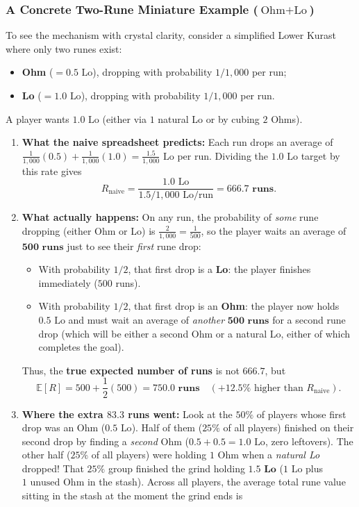 \documentclass[11pt,reqno]{amsart}
\theoremstyle{definition}
\begin{document}
\subsubsection*{A Concrete Two-Rune Miniature Example ($\text{Ohm} + \text{Lo}$)}
To see the mechanism with crystal clarity, consider a simplified Lower Kurast where only two runes exist:
\begin{itemize}
    \item \textbf{Ohm} ($= 0.5\text{ Lo}$), dropping with probability $1/1{,}000$ per run;
    \item \textbf{Lo} ($= 1.0\text{ Lo}$), dropping with probability $1/1{,}000$ per run.
\end{itemize}
A player wants $1.0\text{ Lo}$ (either via $1$ natural Lo or by cubing $2$ Ohms).
\begin{enumerate}
    \item \textbf{What the naive spreadsheet predicts:} Each run drops an average of $\frac{1}{1{,}000}(0.5) + \frac{1}{1{,}000}(1.0) = \frac{1.5}{1{,}000}\text{ Lo}$ per run. Dividing the $1.0\text{ Lo}$ target by this rate gives
    \[
        R_{\text{naive}} = \frac{1.0\text{ Lo}}{1.5 / 1{,}000\text{ Lo/run}} = \mathbf{666.7\text{ runs}}.
    \]
    \item \textbf{What actually happens:} On any run, the probability of \emph{some} rune dropping (either Ohm or Lo) is $\frac{2}{1{,}000} = \frac{1}{500}$, so the player waits an average of $\mathbf{500\text{ runs}}$ just to see their \emph{first} rune drop:
    \begin{itemize}
        \item With probability $1/2$, that first drop is a \textbf{Lo}: the player finishes immediately ($500$ runs).
        \item With probability $1/2$, that first drop is an \textbf{Ohm}: the player now holds $0.5\text{ Lo}$ and must wait an average of \emph{another} $\mathbf{500\text{ runs}}$ for a second rune drop (which will be either a second Ohm or a natural Lo, either of which completes the goal).
    \end{itemize}
    Thus, the \textbf{true expected number of runs} is not $666.7$, but
    \[
        \mathbb{E}[R] = 500 + \frac{1}{2}(500) = \mathbf{750.0\text{ runs}} \quad \left(+12.5\%\text{ higher than } R_{\text{naive}}\right).
    \]
    \item \textbf{Where the extra $83.3$ runs went:} Look at the $50\%$ of players whose first drop was an Ohm ($0.5\text{ Lo}$). Half of them ($25\%$ of all players) finished on their second drop by finding a \emph{second} Ohm ($0.5 + 0.5 = 1.0\text{ Lo}$, zero leftovers). The other half ($25\%$ of all players) were holding $1\text{ Ohm}$ when a \emph{natural Lo} dropped! That $25\%$ group finished the grind holding $\mathbf{1.5\text{ Lo}}$ ($1\text{ Lo}$ plus $1\text{ unused Ohm}$ in the stash). Across all players, the average total rune value sitting in the stash at the moment the grind ends is

\end{enumerate}
\end{document}
